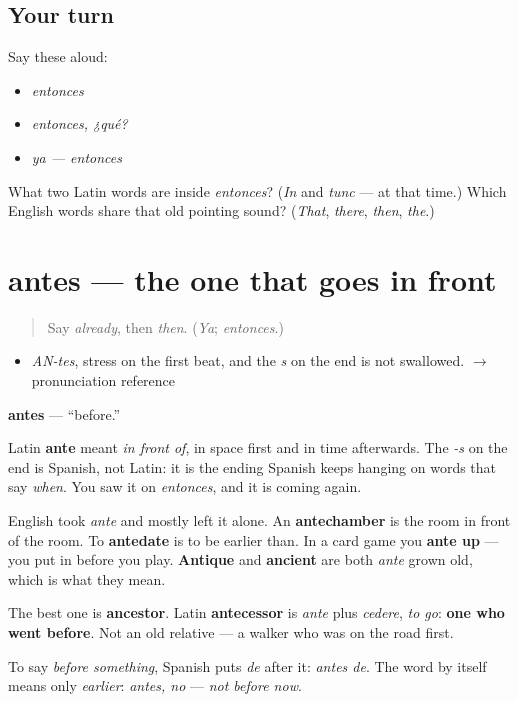 \subsection*{Your turn}
Say these aloud:

\begin{itemize}
\raggedright
  \item \emph{entonces}
  \item \emph{entonces, ¿qué?}
  \item \emph{ya — entonces}
\end{itemize}

\begin{tcolorbox}[breakable,colback=teal!4,colframe=teal!35!black,title={Before you move on}]
What two Latin words are inside \emph{entonces}? (\emph{In} and \emph{tunc} — at that time.) Which English words share that old pointing sound? (\emph{That}, \emph{there}, \emph{then}, \emph{the}.)
\end{tcolorbox}
\section[antes]{antes — the one that goes in front}

\label{lesson:ES-C323-antes}



\begin{quote}
Say \emph{already}, then \emph{then}. (\emph{Ya}; \emph{entonces}.)
\end{quote}

\begin{sounds}
\begin{itemize}
\raggedright
  \item \emph{AN-tes}, stress on the first beat, and the \emph{s} on the end is not swallowed. $\to$ pronunciation reference
\end{itemize}
\end{sounds}

\begin{cousinweb}
\textbf{antes} — \textquotedblleft{}before.\textquotedblright{}

Latin \textbf{ante} meant \emph{in front of}, in space first and in time afterwards. The \emph{-s} on the end is Spanish, not Latin: it is the ending Spanish keeps hanging on words that say \emph{when}. You saw it on \emph{entonces}, and it is coming again.

English took \emph{ante} and mostly left it alone. An \textbf{antechamber} is the room in front of the room. To \textbf{antedate} is to be earlier than. In a card game you \textbf{ante up} — you put in before you play. \textbf{Antique} and \textbf{ancient} are both \emph{ante} grown old, which is what they mean.

The best one is \textbf{ancestor}. Latin \textbf{antecessor} is \emph{ante} plus \emph{cedere}, \emph{to go}: \textbf{one who went before}. Not an old relative — a walker who was on the road first.

To say \emph{before something}, Spanish puts \emph{de} after it: \emph{antes de}. The word by itself means only \emph{earlier}: \emph{antes, no} — \emph{not before now}.
\end{cousinweb}

